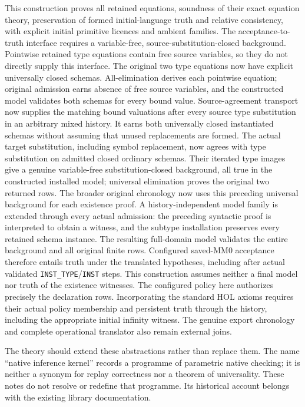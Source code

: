 \documentclass[11pt]{article}
\newcommand{\code}[1]{\nolinkurl{#1}}
\begin{document}
This construction proves all retained equations, soundness of their exact
equation theory, preservation of formed initial-language truth and relative
consistency, with explicit initial primitive licences and ambient families.
The acceptance-to-truth interface requires a variable-free,
source-substitution-closed background. Pointwise retained type equations
contain free source variables, so they do not directly supply this interface.
The original two type equations now have explicit universally closed
schemas. All-elimination derives each pointwise equation; original admission
earns absence of free source variables, and the constructed model validates
both schemas for every bound value. Source-agreement transport now supplies
the matching bound valuations after every source type substitution in an
arbitrary mixed history. It earns both universally closed instantiated
schemas without assuming that unused replacements are formed. The actual target substitution, including symbol replacement, now
agrees with type substitution on admitted closed ordinary schemas. Their
iterated type images give a genuine variable-free substitution-closed
background, all true in the constructed installed model; universal
elimination proves the original two returned rows. The broader original
chronology now uses this preceding universal background for each existence
proof. A history-independent model family is extended through every actual
admission: the preceding syntactic proof is interpreted to obtain a witness,
and the subtype installation preserves every retained schema instance.
The resulting full-domain model validates the entire background and all
original finite rows. Configured saved-MM0 acceptance therefore entails truth
under the translated hypotheses, including after actual validated
\code{INST\_TYPE}/\code{INST} steps. This construction assumes neither a final
model nor truth of the existence witnesses. The configured policy here
authorizes precisely the declaration rows. Incorporating the standard
HOL axioms requires their actual policy membership and persistent truth
through the history, including the appropriate initial infinity witness.
The genuine export chronology and complete operational translator also
remain external joins.

The theory should extend these abstractions rather than replace them.
The name ``native inference kernel'' records a programme of parametric
native checking; it is neither a synonym for replay correctness nor a
theorem of universality. These notes do not resolve or redefine that
programme. Its historical account belongs with the existing library
documentation.
\end{document}
